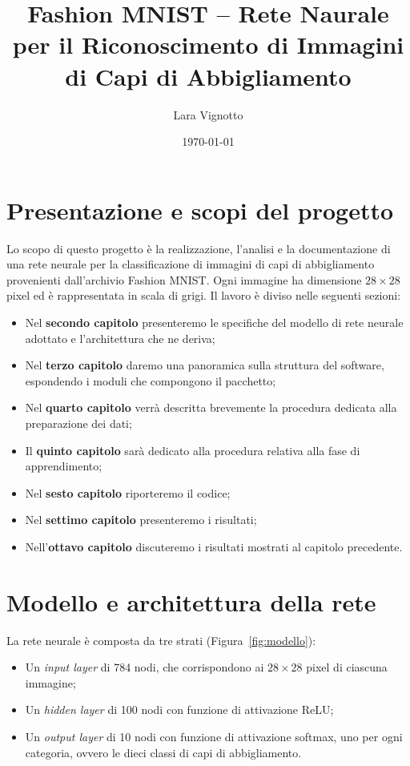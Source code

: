 \documentclass[a4paper,12pt]{article}
\title{\textbf{Fashion MNIST -- Rete Naurale per il Riconoscimento di Immagini di Capi di Abbigliamento}}
\author{Lara Vignotto}
\date{\today}
\begin{document}
\maketitle

\vfill
\tableofcontents


\newpage
\section{Presentazione e scopi del progetto}
Lo scopo di questo progetto è la realizzazione, l'analisi e la documentazione di una rete neurale per la classificazione di immagini di capi di abbigliamento provenienti dall'archivio Fashion MNIST. Ogni immagine ha dimensione $28\times28$ pixel ed è rappresentata in scala di grigi. Il lavoro è diviso nelle seguenti sezioni:
\begin{itemize}
    \item Nel \textbf{secondo capitolo} presenteremo le specifiche del modello di rete neurale adottato e l'architettura che ne deriva;
    \item Nel \textbf{terzo capitolo} daremo una panoramica sulla struttura del software, espondendo i moduli che compongono il pacchetto;
    \item Nel \textbf{quarto capitolo} verrà descritta brevemente la procedura dedicata alla preparazione dei dati;
    \item Il \textbf{quinto capitolo} sarà dedicato alla procedura relativa alla fase di apprendimento;
    \item Nel \textbf{sesto capitolo} riporteremo il codice;
    \item Nel \textbf{settimo capitolo} presenteremo i risultati;
    \item Nell'\textbf{ottavo capitolo} discuteremo i risultati mostrati al capitolo precedente.
\end{itemize}




\newpage
\section{Modello e architettura della rete} %

La rete neurale è composta da tre strati (Figura~\vref{fig:modello}):
\begin{itemize}
    \item Un \emph{input layer} di 784 nodi, che corrispondono ai $28\times28$ pixel di ciascuna immagine;
    \item Un \emph{hidden layer} di 100 nodi con funzione di attivazione ReLU;
    \item Un \emph{output layer} di 10 nodi con funzione di attivazione softmax, uno per ogni categoria, ovvero le dieci classi di capi di abbigliamento.
\end{itemize}
\end{document}
